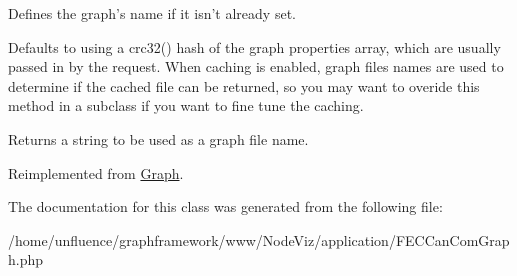 Defines the graph's name if it isn't already set. 

Defaults to using a crc32() hash of the graph properties array, which are usually passed in by the request. When caching is enabled, graph files names are used to determine if the cached file can be returned, so you may want to overide this method in a subclass if you want to fine tune the caching. \begin{DoxyReturn}{Returns}
a string to be used as a graph file name. 
\end{DoxyReturn}


Reimplemented from \hyperlink{classGraph_ae31fe01b00d373a1d022286a53f150a2}{Graph}.



The documentation for this class was generated from the following file:\begin{DoxyCompactItemize}
\item 
/home/unfluence/graphframework/www/NodeViz/application/FECCanComGraph.php\end{DoxyCompactItemize}
